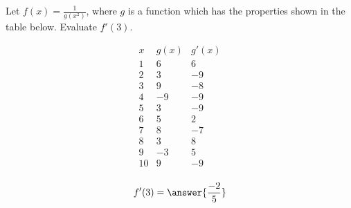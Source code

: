 \documentclass{ximera}
\author{Steven Gubkin}
\begin{document}
\begin{exercise}


Let $f(x) = \frac{1}{g(x^2)}$, where $g$ is a function which has the properties shown in the table below.  Evaluate $f'(3)$.

\[
\begin{array}{c|c|c}
 x & g(x) & g'(x)\\ \hline
1 & 6 & 6\\
2 & 3 & -9\\
3 & 9 & -8\\
4 & -9 & -9\\
5 & 3 & -9\\
6 & 5 & 2\\
7 & 8 & -7\\
8 & 3 & 8\\
9 & -3 & 5\\
10 & 9 & -9\\
\end{array}
\]

\begin{prompt}
	$$f'(3) = \answer{\frac{-2}{5}}$$
\end{prompt}


\end{exercise}
\end{document}
